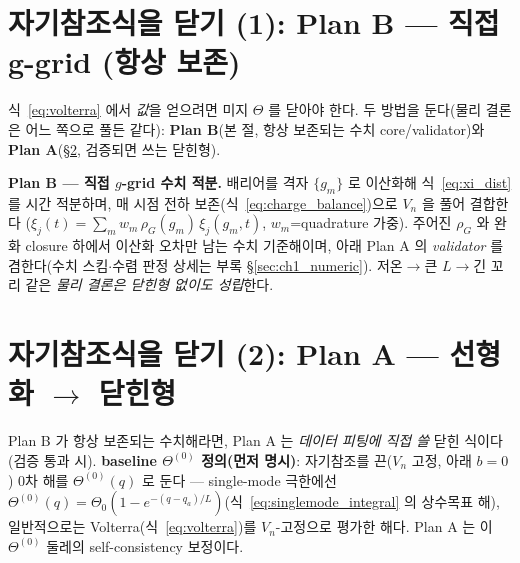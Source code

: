 \documentclass[11pt,a4paper]{article}
\begin{document}
\section{자기참조식을 닫기 (1): Plan B — 직접 g-grid (항상 보존)}\label{sec:planB}
식~\eqref{eq:volterra} 에서 \emph{값}을 얻으려면 미지 $\Theta$ 를 닫아야 한다. 두 방법을 둔다(물리 결론은 어느
쪽으로 풀든 같다): \textbf{Plan B}(본 절, 항상 보존되는 수치 core/validator)와 \textbf{Plan A}(\S\ref{sec:planA},
검증되면 쓰는 닫힌형).

\textbf{Plan B — 직접 $g$-grid 수치 적분.} 배리어를 격자 $\{g_m\}$ 로 이산화해
식~\eqref{eq:xi_dist} 를 시간 적분하며, 매 시점 전하 보존(식~\eqref{eq:charge_balance})으로 $V_n$ 을 풀어 결합한다
($\xi_j(t)=\sum_m w_m\,\rho_G(g_m)\,\xi_j(g_m,t)$, $w_m$=quadrature 가중). 주어진 $\rho_G$ 와 완화 closure
하에서 이산화 오차만 남는 수치 기준해이며, 아래 Plan A 의 \emph{validator} 를 겸한다(수치 스킴$\cdot$수렴 판정
상세는 부록 \S\ref{sec:ch1_numeric}). 저온$\to$큰 $L$$\to$긴 꼬리 같은 \emph{물리 결론은 닫힌형 없이도 성립}한다.

\section{자기참조식을 닫기 (2): Plan A — 선형화 $\to$ 닫힌형}\label{sec:planA}
Plan B 가 항상 보존되는 수치해라면, Plan A 는 \emph{데이터 피팅에 직접 쓸} 닫힌 식이다(검증 통과 시). \textbf{baseline
$\Theta^{(0)}$ 정의(먼저 명시)}: 자기참조를 끈($V_n$ 고정, 아래 $b=0$) 0차 해를 $\Theta^{(0)}(q)$ 로 둔다 —
single-mode 극한에선 $\Theta^{(0)}(q)=\Theta_0(1-e^{-(q-q_a)/L})$(식~\eqref{eq:singlemode_integral} 의 상수목표
해), 일반적으로는 Volterra(식~\eqref{eq:volterra})를 $V_n$-고정으로 평가한 해다. Plan A 는 이 $\Theta^{(0)}$ 둘레의
self-consistency 보정이다.
\end{document}
